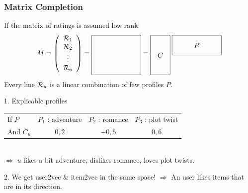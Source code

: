 \documentclass[handout]{beamer}
\begin{document}
\begin{frame}
	\frametitle{Matrix Completion}
	If the matrix of ratings is assumed \alert{low rank}:
	\[ M = \left(\begin{array}{c}
	\R_1\\
	\R_2\\
	\vdots\\
	\R_n
	\end{array}\right) = \raisebox{-1cm}{\begin{tikzpicture}
	\draw (0,0) rectangle (2.5,2);
	\end{tikzpicture}} =
	\raisebox{-1cm}{\begin{tikzpicture}
	\draw (0,0) rectangle ++(1,2);
	\draw node at (0.5,1) {$C$};
	\draw (1.1,1) rectangle ++(2.5,1);
	\draw node at (2.35,1.5) {$P$};
	\end{tikzpicture}} \]
	Every line $\mathcal{R}_u$ is a linear combination of few profiles $P$.
  \pause
  \begin{exampleblock}{1. Explicable profiles}
	\begin{tabular}{@{}lccc@{}}
	If $P$ & $P_1$ : adventure & $P_2$ : romance & $P_3$ : plot twist\\
	And $C_u$ & $0,2$ & $-0,5$ & $0,6$
	\end{tabular}\\
	$\Rightarrow$ $u$ \alert{likes a bit} adventure, \alert{dislikes} romance, \alert{loves} plot twists.
	\end{exampleblock}
  \pause
  \begin{exampleblock}{2. We get user2vec \& item2vec in the same space!}
  $\Rightarrow$ An user likes items that are \alert{in its direction}.\\[1pt]\vfill
  \end{exampleblock}
\end{frame}
\end{document}

